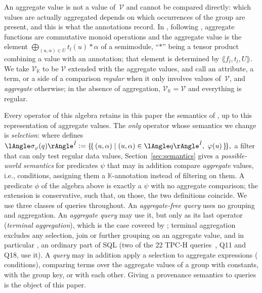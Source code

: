 An aggregate value is not a value of~$\mathcal V$ and cannot be compared
directly: which values are actually aggregated depends on which
occurrences of the group are present, and this is what the annotations
record. In \cite{sen2026provsql}, following
\cite{amsterdamer2011provenance}, aggregate functions are commutative
monoid operations and the aggregate value is the element
$\bigoplus_{(u,\alpha)\in U}t_l(u)*\alpha$ of a semimodule, ``$*$''
being a tensor product combining a value with an annotation; that element
is determined by $\lAngle f_l,t_l,U\rAngle$.
We take $\mathcal V_{\mathbb K}$ to be $\mathcal V$ extended with the
aggregate values, and call an attribute, a term, or a side of a
comparison \emph{regular} when it only involves values of~$\mathcal V$,
and \emph{aggregate} otherwise; in the absence of aggregation, $\mathcal
V_{\mathbb K}=\mathcal V$ and everything is regular.

Every operator of this algebra retains in this paper the semantics of
\cite{sen2026provsql}, up to this representation of aggregate values. The
\emph{only} operator whose
semantics we change is \emph{selection}: where
\cite{sen2026provsql} defines
\(
  \angsem{\hat I}{\sigma_\phi(q)}\defeq
  \mset{(u,\alpha)\mid (u,\alpha)\in\angsem{\hat I}{q},\ \phi(u)},
\)
a filter that can only test regular data values,
Section~\ref{sec:semantics} gives a \emph{possible-world semantics} for
predicates $\psi$ that may in addition compare \emph{aggregate} values,
i.e.,  conditions, assigning them a $\mathbb K$-annotation
instead of filtering on them. A predicate $\phi$ of the algebra above is
exactly a $\psi$ with no aggregate comparison; the extension is
conservative, such that, on those, the two definitions coincide.
We use three classes of queries throughout. An \emph{aggregate-free
query} uses no grouping and aggregation. An \emph{aggregate query} may
use it, but only as its last operator (\emph{terminal aggregation}),
which is the case covered by \cite{sen2026provsql};
terminal
aggregation excludes any selection, join or further grouping on an
aggregate value, and in particular , an ordinary part of SQL
(two of the 22 TPC-H queries~\cite{tpch}, Q11 and Q18, use it).
A
\emph{ query} may in addition apply a selection to aggregate
expressions ( conditions), comparing terms over the
aggregate values of a group with constants, with the group key, or with
each other.
Giving a provenance
semantics to  queries is the object of this paper.


